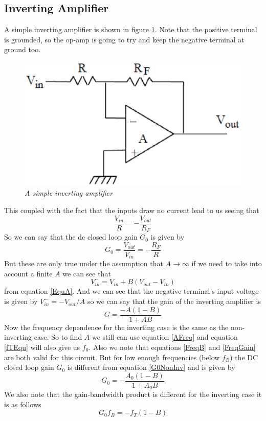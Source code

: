 \documentclass[11pt]{article}
\numberwithin{equation}{section}
\numberwithin{figure}{section}
\numberwithin{table}{section}
\begin{document}
\subsection{Inverting Amplifier}
A simple inverting amplifier is shown in figure \ref{FigInvAmp}. Note that the positive terminal is grounded, so the op-amp is going to try and keep the negative terminal at ground too. 
\begin{figure}[h]
\centering
\includegraphics[scale=0.60]{FigInvAmp.eps}
\caption{\textit{A simple inverting amplifier}}
\label{FigInvAmp}
\end{figure}
This coupled with the fact that the inputs draw no current lead to us seeing that
$$\frac{V_{in}}{R} = -\frac{V_{out}}{R_F}$$
So we can say that the dc closed loop gain $G_0$ is given by
$$G_0 = \frac{V_{out}}{V_{in}}=-\frac{R_F}{R}$$
But these are only true under the assumption that $A\rightarrow\infty$ if we need to take into account a finite $A$ we can see that
$$V^-_{in} = V_{in}+B(V_{out}-V_{in})$$
from equation \ref{EquA}. And we can see that the negative terminal's input voltage is given by $V_{in}^- = -V_{out}/A$ so we can say that the gain of the inverting amplifier is 
\begin{equation}
G = \frac{-A(1-B)}{1+AB}
\label{GainInvAmp}
\end{equation}
Now the frequency dependence for the inverting case is the same as the non-inverting case. So to find $A$ we still can use equation \ref{AFreq} and equation \ref{fTEqu} will also give us $f_0$. Also we note that equations \ref{FreqB} and \ref{FreqGain} are both valid for this circuit. But for low enough frequencies (below $f_B$) the DC closed loop gain $G_0$ is different from equation \ref{G0NonInv} and is given by
\begin{equation}
G_0 = -\frac{A_0(1-B)}{1+A_0B}
\label{G0InvAmp}
\end{equation}
We also note that the gain-bandwidth product is different for the inverting case it is as follows
\begin{equation}
G_0f_B = -f_T(1-B)
\label{InvGainBand}
\end{equation}
\end{document}
